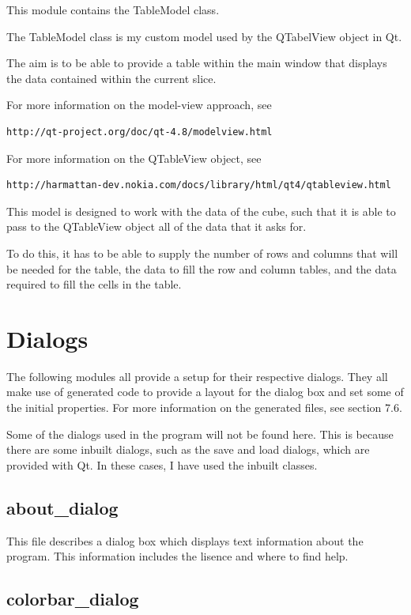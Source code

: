 \documentclass[whitecover]{MO_report}
\begin{document}
This module contains the TableModel class.

The TableModel class is my custom model used by the QTabelView object in Qt.

The aim is to be able to provide a table within the main window that displays
the data contained within the current slice.

For more information on the model-view approach, see
\begin{verbatim}
http://qt-project.org/doc/qt-4.8/modelview.html
\end{verbatim}

For more information on the QTableView object, see
\begin{verbatim}
http://harmattan-dev.nokia.com/docs/library/html/qt4/qtableview.html
\end{verbatim}

This model is designed to work with the data of the cube, such that it is able
to pass to the QTableView object all of the data that it asks for.

To do this, it has to be able to supply the number of rows and columns that
will be needed for the table, the data to fill the row and column tables, and
the data required to fill the cells in the table.

\section{Dialogs}

The following modules all provide a setup for their respective dialogs. They
all make use of generated code to provide a layout for the dialog box and set
some of the initial properties. For more information on the generated files,
see section 7.6.

Some of the dialogs used in the program will not be found here. This is because
there are some inbuilt dialogs, such as the save and load dialogs, which are
provided with Qt. In these cases, I have used the inbuilt classes.

\subsection{about\_dialog}

This file describes a dialog box which displays text information about the
program. This information includes the lisence and where to find help.

\subsection{colorbar\_dialog}
\end{document}

